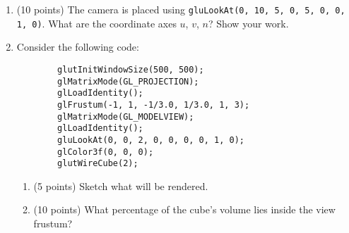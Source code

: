 \documentclass[13pt]{letter}
\begin{document}
\begin{enumerate}
	\vspace{13pt}

	\item (10 points)
	The camera is placed using \texttt{gluLookAt(0, 10, 5, 0, 5, 0, 0, 1, 0)}. What are the coordinate axes $u$, $v$, $n$? Show your work.

	\vspace{13pt}

	\item 
	Consider the following code:
	
	\begin{verbatim}
		glutInitWindowSize(500, 500);
		glMatrixMode(GL_PROJECTION);
		glLoadIdentity();
		glFrustum(-1, 1, -1/3.0, 1/3.0, 1, 3);
		glMatrixMode(GL_MODELVIEW);
		glLoadIdentity();
		gluLookAt(0, 0, 2, 0, 0, 0, 0, 1, 0);
		glColor3f(0, 0, 0);
		glutWireCube(2);
	\end{verbatim}
	\begin{enumerate}
		\item (5 points)
		Sketch what will be rendered.

		\item (10 points) 
		What percentage of the cube’s volume lies inside the view frustum?
	
	\end{enumerate}
\end{enumerate}
\end{document}
